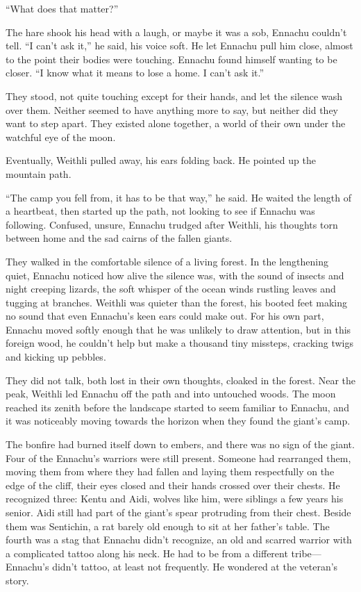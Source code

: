 ``What does that matter?''

The hare shook his head with a laugh, or maybe it was a sob, Ennachu couldn't tell. ``I can't ask it,'' he said, his voice soft. He let Ennachu pull him close, almost to the point their bodies were touching. Ennachu found himself wanting to be closer. ``I know what it means to lose a home. I can't ask it.''

They stood, not quite touching except for their hands, and let the silence wash over them. Neither seemed to have anything more to say, but neither did they want to step apart. They existed alone together, a world of their own under the watchful eye of the moon.

Eventually, Weithli pulled away, his ears folding back. He pointed up the mountain path.

``The camp you fell from, it has to be that way,'' he said. He waited the length of a heartbeat, then started up the path, not looking to see if Ennachu was following. Confused, unsure, Ennachu trudged after Weithli, his thoughts torn between home and the sad cairns of the fallen giants.

They walked in the comfortable silence of a living forest. In the lengthening quiet, Ennachu noticed how alive the silence was, with the sound of insects and night creeping lizards, the soft whisper of the ocean winds rustling leaves and tugging at branches. Weithli was quieter than the forest, his booted feet making no sound that even Ennachu's keen ears could make out. For his own part, Ennachu moved softly enough that he was unlikely to draw attention, but in this foreign wood, he couldn't help but make a thousand tiny missteps, cracking twigs and kicking up pebbles.

They did not talk, both lost in their own thoughts, cloaked in the forest. Near the peak, Weithli led Ennachu off the path and into untouched woods. The moon reached its zenith before the landscape started to seem familiar to Ennachu, and it was noticeably moving towards the horizon when they found the giant's camp.

The bonfire had burned itself down to embers, and there was no sign of the giant. Four of the Ennachu's warriors were still present. Someone had rearranged them, moving them from where they had fallen and laying them respectfully on the edge of the cliff, their eyes closed and their hands crossed over their chests. He recognized three: Kentu and Aidi, wolves like him, were siblings a few years his senior. Aidi still had part of the giant's spear protruding from their chest. Beside them was Sentichin, a rat barely old enough to sit at her father's table. The fourth was a stag that Ennachu didn't recognize, an old and scarred warrior with a complicated tattoo along his neck. He had to be from a different tribe---Ennachu's didn't tattoo, at least not frequently. He wondered at the veteran's story.

